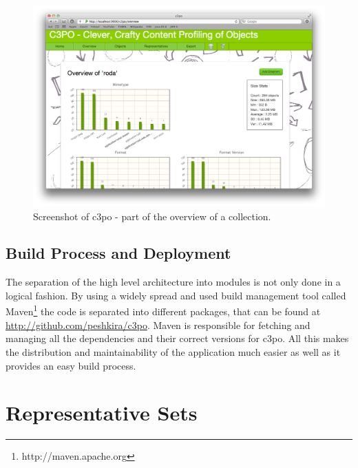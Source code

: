 \begin{figure}[htb]
\begin{center}
\includegraphics[width=5.5in]{figures/architecture/web_app_overview}
\caption{Screenshot of c3po - part of the overview of a collection.}
\label{fig:web_app_overview}
\end{center}
\end{figure}


\subsection{Build Process and Deployment}
The separation of the high level architecture into modules is not only done in a logical fashion. By using a widely spread and used build management tool called Maven\footnote{http://maven.apache.org} the code is separated into different packages, that can be found at \url{http://github.com/peshkira/c3po}. Maven is responsible for fetching and managing all the dependencies and their correct versions for c3po.
All this makes the distribution and maintainability of the application much easier as well as it provides an easy build process.

\section{Representative Sets}

